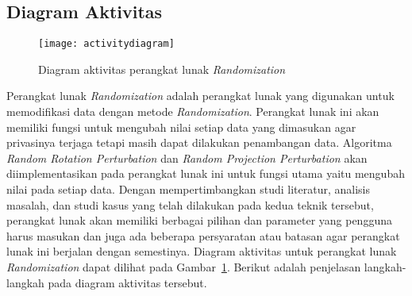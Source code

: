 \subsection{Diagram Aktivitas}
\label{subsec:diagram-aktivitas}

\begin{figure}
    \centering
    \texttt{[image: activitydiagram]}
    \caption{Diagram aktivitas perangkat lunak \textit{Randomization}}
    \label{fig:activitydiagram}
\end{figure}

Perangkat lunak \textit{Randomization} adalah perangkat lunak yang digunakan untuk memodifikasi data dengan metode \textit{Randomization}. Perangkat lunak ini akan memiliki fungsi untuk mengubah nilai setiap data yang dimasukan agar privasinya terjaga tetapi masih dapat dilakukan penambangan data. Algoritma \textit{Random Rotation Perturbation} dan \textit{Random Projection Perturbation} akan diimplementasikan pada perangkat lunak ini untuk fungsi utama yaitu mengubah nilai pada setiap data. Dengan mempertimbangkan studi literatur, analisis masalah, dan studi kasus yang telah dilakukan pada kedua teknik tersebut, perangkat lunak akan memiliki berbagai pilihan dan parameter yang pengguna harus masukan dan juga ada beberapa persyaratan atau batasan agar perangkat lunak ini berjalan dengan semestinya. Diagram aktivitas untuk perangkat lunak \textit{Randomization} dapat dilihat pada Gambar~\ref{fig:activitydiagram}. Berikut adalah penjelasan langkah-langkah pada diagram aktivitas tersebut.
